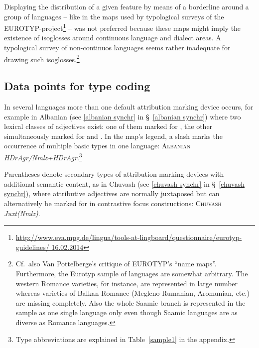 Displaying the distribution of a given feature by means of a borderline around a group of languages – like in the maps used by typological surveys of the EUROTYP\hyp{}project\footnote{\url{http://www.eva.mpg.de/lingua/tools-at-lingboard/questionnaire/eurotyp-guidelines/ 16.02.2014}} – was not preferred because these maps might imply the existence of isoglosses around continuous language and dialect areas. A typological survey of non-continuos languages seems rather inadequate for drawing such isoglosses.\footnote{Cf.~also Van Pottelberge's \citeyear{van-pottelberge2001} critique of EUROTYP's “name maps”. Furthermore, the Eurotyp sample of languages are somewhat arbitrary. The western Romance varieties, for instance, are represented in large number whereas varieties of Balkan Romance (Megleno-Rumanian, Aromunian, etc.) are missing completely. Also the whole Saamic branch is represented in the  sample as one single language only even though Saamic languages are as diverse as Romance languages.}

\subsection[Type coding]{Data points for type coding}
In several languages more than one default attribution marking device occurs, for example in Albanian (see \ref{albanian synchr} in \S~\ref{albanian synchr}) where two lexical classes of adjectives exist: one of them marked for , the other simultaneously marked for  and . In the map's legend, a slash marks the occurrence of multiple basic types in one language: \textsc{Albanian} \textit{HDrAgr/Nmlz+HDrAgr}.\footnote{Type abbreviations are explained in Table~\ref{sample1} in the appendix.}

Parentheses denote secondary types of attribution marking devices with additional semantic content, as in Chuvash (see \ref{chuvash synchr} in \S~\ref{chuvash synchr}), where attributive adjectives are normally juxtaposed but can alternatively be marked for  in contrastive focus constructions: \textsc{Chuvash} \textit{Juxt(Nmlz)}.

